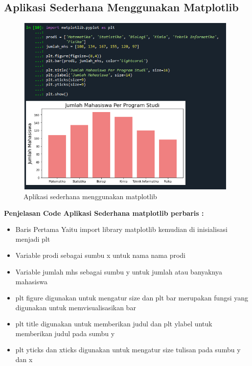 \subsection{Aplikasi Sederhana Menggunakan Matplotlib} 
\begin{figure}[!htbp]
    \centering
    \includegraphics[width=11cm,height=9cm]{figures/aplikasi_matplotlib.png}
    \caption{Aplikasi sederhana menggunakan matplotlib}
    \label{penanda}
\end{figure}
    \textbf{Penjelasan Code Aplikasi Sederhana matplotlib perbaris :}
    \begin{itemize}
    \item Baris Pertama Yaitu import library matplotlib kemudian di inisialisasi menjadi plt
    \item Variable prodi sebagai sumbu x untuk nama nama prodi
    \item Variable jumlah mhs sebagai sumbu y untuk jumlah atau banyaknya mahasiswa
    \item plt figure digunakan untuk mengatur size dan plt bar merupakan fungsi yang digunakan untuk memvisualisasikan bar
    \item plt title digunakan untuk memberikan judul dan plt ylabel untuk memberikan judul pada sumbu y
    \item plt yticks dan xticks digunakan untuk mengatur size tulisan pada sumbu y dan x
    \end{itemize}

